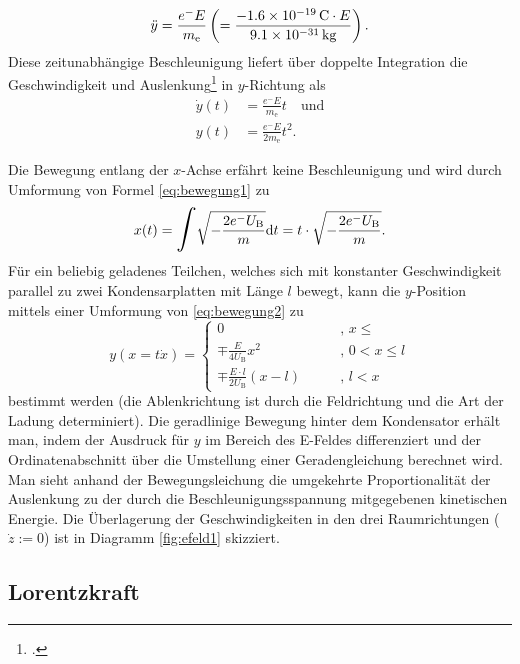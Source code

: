 \begin{equation}
\label{eq:beschl1}
\ddot{y}=\frac{e^-E}{m_\mathrm{e}}\left(=\frac{\SI{-1.6E-19}{\coulomb}\cdot E}{\SI{9.1E-31}{\kilo\gram}}\right).
\end{equation}
Diese zeitunabhängige Beschleunigung liefert über doppelte Integration die Geschwindigkeit und Auslenkung\footcite[vgl.][S.\,44]{Demtroeder2008} in $y$-Richtung als
\begin{equation}
\begin{alignedat}{2}
\label{eq:bewegung2}
\dot{y}(t)&=\frac{e^-E}{m_\mathrm{e}}t\quad\text{und}\\
 y(t)&=\frac{e^- E}{2m_\mathrm{e}}t^2.
\end{alignedat}
\end{equation}
 
Die Bewegung entlang der $x$-Achse erfährt keine Beschleunigung und wird durch Umformung von Formel \eqref{eq:bewegung1} zu
\begin{equation}
\label{eq:bewegung3}
x(t)= \mathlarger{\mathlarger{\int}} \sqrt{-\frac{2e^-U_\mathrm{B}}{m}}\mathrm{d}t=t\cdot\sqrt{-\frac{2e^-U_\mathrm{B}}{m}}.
\end{equation}
Für ein beliebig geladenes Teilchen, welches sich mit konstanter Geschwindigkeit parallel zu zwei Kondensarplatten mit Länge $l$ bewegt, kann die $y$-Position mittels einer Umformung von \eqref{eq:bewegung2} zu
\begin{equation}
\label{eq:bewegung4}
y(x=t\dot{x})=
\begin{cases}
0\qquad &,\, x\leq\\
\mp\frac{E}{4U_\mathrm{B}}x^2  \qquad &,\, 0< x \leq l\\
\mp\frac{E\cdot l}{2U_\mathrm{B}}\left(x-l\right)   \qquad &,\,l< x
\end{cases}
\end{equation}
bestimmt werden (die Ablenkrichtung ist durch die Feldrichtung und die Art der Ladung determiniert). Die geradlinige Bewegung hinter dem Kondensator erhält man, indem der Ausdruck für $y$ im Bereich des E-Feldes differenziert und der Ordinatenabschnitt über die Umstellung einer Geradengleichung berechnet wird. Man sieht anhand der Bewegungsleichung die umgekehrte Proportionalität der Auslenkung zu der durch die Beschleunigungsspannung mitgegebenen kinetischen Energie. Die Überlagerung der Geschwindigkeiten in den drei Raumrichtungen ($\dot{z}:=0$) ist in Diagramm \ref{fig:efeld1} skizziert.  

\newpage 
\subsection{Lorentzkraft}

